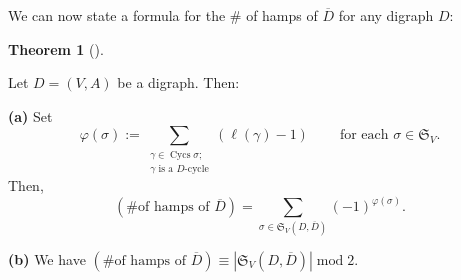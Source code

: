\documentclass[numbers=enddot,12pt,final,onecolumn,notitlepage]{scrartcl}%
\numberwithin{exer}{section}
\theoremstyle{definition}
\newtheorem{theo}{Theorem}[section]
\newenvironment{theorem}[1][]
{\begin{theo}[#1]\begin{leftbar}}
{\end{leftbar}\end{theo}}
\let\sumnonlimits\sum
\renewcommand{\sum}{\sumnonlimits\limits}
\begin{document}
We can now state a formula for the \# of hamps of $\overline{D}$ for any
digraph $D$:

\begin{theorem}
\label{thm.hamps-formula-Dbar}Let $D=\left(  V,A\right)  $ be a digraph. Then:

\textbf{(a)} Set%
\[
\varphi\left(  \sigma\right)  :=\sum_{\substack{\gamma\in\operatorname*{Cycs}%
\sigma;\\\gamma\text{ is a }D\text{-cycle}}}\left(  \ell\left(  \gamma\right)
-1\right)  \ \ \ \ \ \ \ \ \ \ \text{for each }\sigma\in\mathfrak{S}_{V}.
\]
Then,
\[
\left(  \text{\# of hamps of }\overline{D}\right)  =\sum_{\sigma
\in\mathfrak{S}_{V}\left(  D,\overline{D}\right)  }\left(  -1\right)
^{\varphi\left(  \sigma\right)  }.
\]


\textbf{(b)} We have $\left(  \text{\# of hamps of }\overline{D}\right)
\equiv\left\vert \mathfrak{S}_{V}\left(  D,\overline{D}\right)  \right\vert
\operatorname{mod}2$.
\end{theorem}
\end{document}
